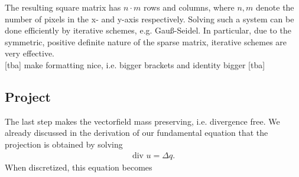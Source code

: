 \documentclass[a4paper,10pt,oneside,final,german,openbib,pdftex,titlepage]{scrbook}
\begin{document}
The resulting square matrix has $n\cdot m$ rows and columns, where $n, m$ denote the number of pixels in the x- and y-axis respectively. Solving such a system can be done efficiently by iterative schemes, e.g. Gauß-Seidel. In particular, due to the symmetric, positive definite nature of the sparse matrix, iterative schemes are very effective.\\

[tba] make formatting nice, i.e. bigger brackets and identity bigger [tba]\\

\subsection{Project}
The last step makes the vectorfield mass preserving, i.e. divergence free. We already discussed in the derivation of our fundamental equation that the projection is obtained by solving
\begin{align*}
	\text{div }u = \Delta q.
\end{align*}
When discretized, this equation becomes
\end{document}
